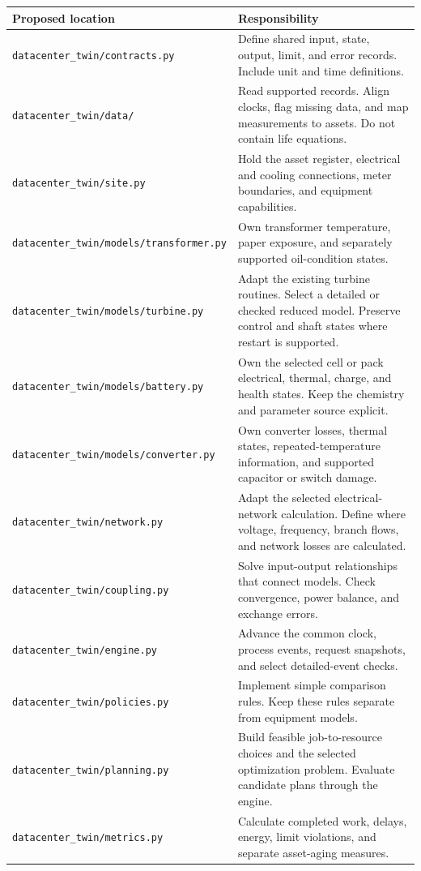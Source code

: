 \documentclass[11pt,a4paper]{report}
\newcommand{\sourcefile}[1]{\nolinkurl{#1}}
\begin{document}
\begin{longtable}{L{0.28\textwidth}L{0.60\textwidth}}
\toprule Proposed location & Responsibility \\ \midrule\endhead
\sourcefile{datacenter_twin/contracts.py} & Define shared input, state, output, limit, and error records. Include unit and time definitions. \\
\sourcefile{datacenter_twin/data/} & Read supported records. Align clocks, flag missing data, and map measurements to assets. Do not contain life equations. \\
\sourcefile{datacenter_twin/site.py} & Hold the asset register, electrical and cooling connections, meter boundaries, and equipment capabilities. \\
\sourcefile{datacenter_twin/models/transformer.py} & Own transformer temperature, paper exposure, and separately supported oil-condition states. \\
\sourcefile{datacenter_twin/models/turbine.py} & Adapt the existing turbine routines. Select a detailed or checked reduced model. Preserve control and shaft states where restart is supported. \\
\sourcefile{datacenter_twin/models/battery.py} & Own the selected cell or pack electrical, thermal, charge, and health states. Keep the chemistry and parameter source explicit. \\
\sourcefile{datacenter_twin/models/converter.py} & Own converter losses, thermal states, repeated-temperature information, and supported capacitor or switch damage. \\
\sourcefile{datacenter_twin/network.py} & Adapt the selected electrical-network calculation. Define where voltage, frequency, branch flows, and network losses are calculated. \\
\sourcefile{datacenter_twin/coupling.py} & Solve input-output relationships that connect models. Check convergence, power balance, and exchange errors. \\
\sourcefile{datacenter_twin/engine.py} & Advance the common clock, process events, request snapshots, and select detailed-event checks. \\
\sourcefile{datacenter_twin/policies.py} & Implement simple comparison rules. Keep these rules separate from equipment models. \\
\sourcefile{datacenter_twin/planning.py} & Build feasible job-to-resource choices and the selected optimization problem. Evaluate candidate plans through the engine. \\
\sourcefile{datacenter_twin/metrics.py} & Calculate completed work, delays, energy, limit violations, and separate asset-aging measures. \\

\end{longtable}
\end{document}
